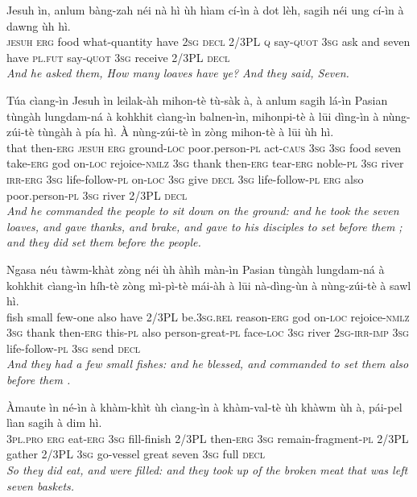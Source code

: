 \documentclass[11pt,a4paper]{article}
\begin{document}
\begin{exe}
\gll Jesuh ìn, anlum bàng-zah néi nà hì ùh hìam cí-ìn à dot lèh, sagih néi ung cí-ìn à dawng ùh hì. \\
     \textsc{jesuh} \textsc{erg} food what-quantity have \textsc{2sg} \textsc{decl} 2/3PL \textsc{q} say-\textsc{quot} \textsc{3sg} ask and seven have \textsc{pl}.\textsc{fut} say-\textsc{quot} \textsc{3sg} receive 2/3PL \textsc{decl} \\
\glt \textcolor{kjvcolor}{\textit{And he asked them, How many loaves have ye? And they said, Seven.}}

\gll Túa cìang-ìn Jesuh ìn leilak-àh mihon-tè tù-sàk à, à anlum sagih lá-ìn Pasian tùngàh lungdam-ná à kohkhit cìang-ìn balnen-ìn, mihonpi-tè à lūi dìng-ìn à nùng-zúi-tè tùngàh à pía hì. À nùng-zúi-tè ìn zòng mihon-tè à lūi ùh hì. \\
     that then-\textsc{erg} \textsc{jesuh} \textsc{erg} ground-\textsc{loc} poor.person-\textsc{pl} act-\textsc{caus} \textsc{3sg} \textsc{3sg} food seven take-\textsc{erg} god on-\textsc{loc} rejoice-\textsc{nmlz} \textsc{3sg} thank then-\textsc{erg} tear-\textsc{erg} noble-\textsc{pl} \textsc{3sg} river \textsc{irr}-\textsc{erg} \textsc{3sg} life-follow-\textsc{pl} on-\textsc{loc} \textsc{3sg} give \textsc{decl} \textsc{3sg} life-follow-\textsc{pl} \textsc{erg} also poor.person-\textsc{pl} \textsc{3sg} river 2/3PL \textsc{decl} \\
\glt \textcolor{kjvcolor}{\textit{And he commanded the people to sit down on the ground: and he took the seven loaves, and gave thanks, and brake, and gave to his disciples to set before them ; and they did set them before the people.}}

\gll Ngasa néu tàwm-khàt zòng néi ùh àhìh màn-ìn Pasian tùngàh lungdam-ná à kohkhit cìang-ìn híh-tè zòng mì-pì-tè mái-àh à lūi nà-dìng-ùn à nùng-zúi-tè à sawl hì. \\
     fish small few-one also have 2/3PL be.\textsc{3sg}.\textsc{rel} reason-\textsc{erg} god on-\textsc{loc} rejoice-\textsc{nmlz} \textsc{3sg} thank then-\textsc{erg} this-\textsc{pl} also person-great-\textsc{pl} face-\textsc{loc} \textsc{3sg} river \textsc{2sg}-\textsc{irr}-\textsc{imp} \textsc{3sg} life-follow-\textsc{pl} \textsc{3sg} send \textsc{decl} \\
\glt \textcolor{kjvcolor}{\textit{And they had a few small fishes: and he blessed, and commanded to set them also before them .}}

\gll Àmaute ìn né-ìn à khàm-khìt ùh cìang-ìn à khàm-val-tè ùh khàwm ùh à, pái-pel lìan sagih à dim hì. \\
     \textsc{3pl}.\textsc{pro} \textsc{erg} eat-\textsc{erg} \textsc{3sg} fill-finish 2/3PL then-\textsc{erg} \textsc{3sg} remain-fragment-\textsc{pl} 2/3PL gather 2/3PL \textsc{3sg} go-vessel great seven \textsc{3sg} full \textsc{decl} \\
\glt \textcolor{kjvcolor}{\textit{So they did eat, and were filled: and they took up of the broken meat that was left seven baskets.}}


\end{exe}
\end{document}
